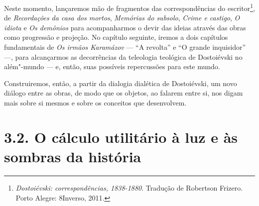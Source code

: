 Neste momento, lançaremos mão de fragmentos das correspondências do
escritor\footnote{\emph{Dostoiévski: correspondências, 1838-1880}.
  Tradução de Robertson Frizero. Porto Alegre: 8Inverso, 2011.}, de
\emph{Recordações da casa dos mortos}, \emph{Memórias do subsolo},
\emph{Crime e castigo}, \emph{O idiota} e \emph{Os demônios} para
acompanharmos o devir das ideias através das obras como progressão e
projeção. No capítulo seguinte, iremos a dois capítulos fundamentais de
\emph{Os irmãos Karamázov} --- ``A revolta'' e ``O grande inquisidor''
---, para alcançarmos as decorrências da teleologia teológica de
Dostoiévski no além"-mundo --- e, então, suas possíveis repercussões para
este mundo.

Construiremos, então, a partir da dialogia dialética de Dostoiévski, um
novo diálogo entre as obras, de modo que os objetos, ao falarem entre
si, nos digam mais sobre si mesmos e sobre os conceitos que desenvolvem.

\section{3.2. O cálculo utilitário à luz e às sombras da história}

